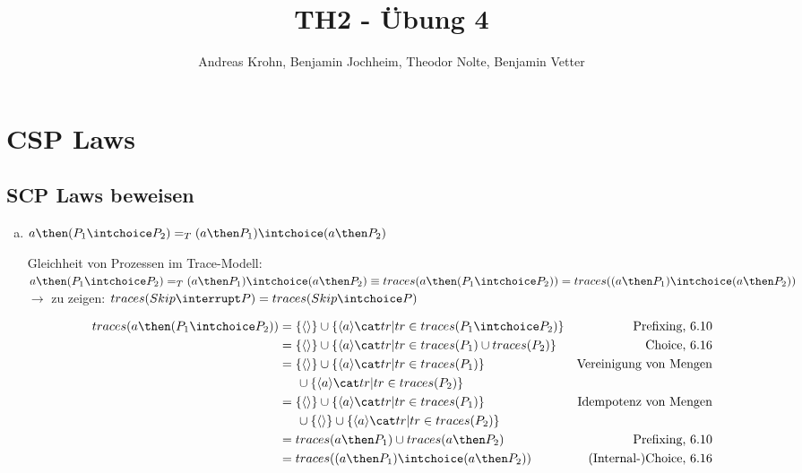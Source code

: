 \documentclass{scrreprt}
\begin{document}
\author{Andreas Krohn, Benjamin Jochheim, Theodor Nolte, Benjamin Vetter}
\title{TH2 - Übung 4}

\maketitle

\chapter{CSP Laws}

\section{SCP Laws beweisen}

\begin{enumerate}[a)]

\item{
  $ a \then (P_1 \intchoice P_2) =_T (a \then P_1) \intchoice (a \then P_2) $

  Gleichheit von Prozessen im Trace-Modell:\\
  $a \then (P_1 \intchoice P_2) =_T (a \then P_1) \intchoice (a \then P_2) \\
  \equiv traces(a \then (P_1 \intchoice P_2)) = traces((a \then P_1) \intchoice (a \then P_2))$ \\

  $\rightarrow$ zu zeigen: $traces(Skip \interrupt P) = traces(Skip \intchoice P)$

  \begin{align*}
    traces(a \then (P_1 \intchoice P_2)) &= \{ \langle \rangle \} \cup \{ \langle a \rangle \cat tr | tr \in traces(P_1 \intchoice P_2)\} & \text{Prefixing, 6.10}\\
                                         &= \{ \langle \rangle \} \cup \{ \langle a \rangle \cat tr | tr \in traces(P_1) \cup traces(P_2)\} & \text{Choice, 6.16}\\
                                         &= \{ \langle \rangle \} \cup \{ \langle a \rangle \cat tr | tr \in traces(P_1)\} &\text{Vereinigung von Mengen}\\
                                         &\hspace{0.5cm}\cup \{ \langle a \rangle \cat tr | tr \in traces(P_2)\}\\
                                         &= \{ \langle \rangle \} \cup \{ \langle a \rangle \cat tr | tr \in traces(P_1)\} &\text{Idempotenz von Mengen}\\
                                         &\hspace{0.5cm}\cup \{ \langle \rangle \} \cup \{ \langle a \rangle \cat tr | tr \in traces(P_2)\}\\
                                         &= traces(a \then P_1) \cup traces(a \then P_2) &\text{Prefixing, 6.10}\\
                                         &= traces((a \then P_1) \intchoice (a \then P_2)) &\text{(Internal-)Choice, 6.16}\\
  \end{align*}
  \flushright{\qedsymbol}\\
}


\end{enumerate}
\end{document}
